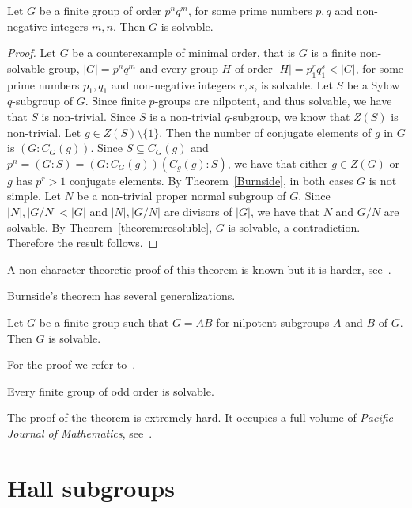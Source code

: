 \begin{theorem}
Let $G$ be a finite group of order $p^nq^m$, for some prime numbers $p,q$ and non-negative integers $m,n$. Then $G$ is solvable.
\end{theorem}

\begin{proof}
    Let $G$ be a counterexample of minimal order, that is $G$ is a finite non-solvable group, $|G|=p^nq^m$ and every group $H$ of order
    $|H|=p_1^{r}q_1^{s}<|G|$, for some prime numbers $p_1,q_1$ and non-negative integers $r,s$, is solvable.  Let $S$ be a Sylow $q$-subgroup of $G$. Since finite $p$-groups are nilpotent, and thus solvable, we have that $S$ is non-trivial. Since $S$ is a non-trivial $q$-subgroup, we know that $Z(S)$ is non-trivial. Let $g\in Z(S)\setminus\{ 1\}$. Then the number of conjugate elements of $g$ in $G$ is $(G:C_G(g))$. Since $S\subseteq C_G(g)$ and $p^n=(G:S)=(G:C_G(g))(C_g(g):S)$, we have that either $g\in Z(G)$ or $g$ has
    $p^r>1$ conjugate elements. By Theorem~\ref{Burnside}, in both cases $G$ is not simple. Let $N$ be a non-trivial proper normal subgroup of $G$. Since $|N|,|G/N|<|G|$ and $|N|,|G/N|$ are divisors of $|G|$, we have that $N$ and $G/N$ are solvable. By Theorem~\ref{theorem:resoluble}, $G$ is solvable, a contradiction. Therefore the result follows.
\end{proof}

A non-character-theoretic proof of this theorem is known but it is harder, see~\cite{MR2426855}.

Burnside's theorem has several generalizations.
\begin{theorem}
\label{thm:KegelWielandt}
Let $G$ be a finite group such that 
$G=AB$ for nilpotent subgroups $A$ and $B$ of $G$. Then $G$ is solvable.
\end{theorem}


For the proof we refer to~\cite[Theorem 2.4.3]{MR1211633}.


\begin{theorem}
\label{thm:FeitThompson}
Every finite group of odd order is solvable.
\end{theorem}


The proof of the theorem is extremely hard. It occupies a full volume of 
\emph{Pacific Journal of Mathematics}, see~\cite{MR166261}.


\section{Hall subgroups}

